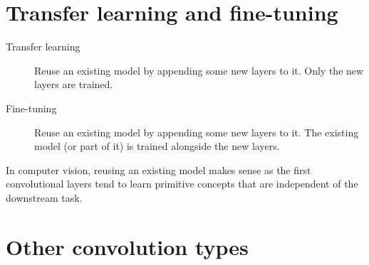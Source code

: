 \section{Transfer learning and fine-tuning}

\begin{description}
    \item[Transfer learning] 
        Reuse an existing model by appending some new layers to it.
        Only the new layers are trained.

    \item[Fine-tuning] 
        Reuse an existing model by appending some new layers to it.
        The existing model (or part of it) is trained alongside the new layers.
\end{description}

\begin{remark}
    In computer vision, reusing an existing model makes sense as 
    the first convolutional layers tend to learn primitive concepts that are independent of the downstream task.
\end{remark}



\section{Other convolution types}

